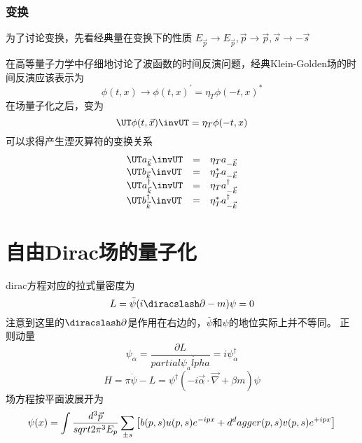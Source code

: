 \subsubsection{\T 变换}
为了讨论\T 变换，先看经典量在\T 变换下的性质
$E_{\vec p}\rightarrow E_{\vec p}, \vec p\rightarrow \vec p, \vec s\rightarrow-\vec s $

在高等量子力学中仔细地讨论了波函数的时间反演问题，经典Klein-Golden场的时间反演应该表示为
\begin{equation}
    \phi(t, x) \rightarrow \phi(t, x)^{\prime} = \eta_T\phi(-t, x)^*
\end{equation}
在场量子化之后，变为
\begin{equation}
    \UT\phi(t,\vec x)\invUT = \eta_T\phi(-t, x)
\end{equation}
可以求得产生湮灭算符的变换关系
\begin{equation}
    \begin{array}{lll}
        \UT a_{\vec k}\invUT &=& \eta_T a_{-\vec k} \\
        \UT b_{\vec k}\invUT &=& \eta_T^* a_{-\vec k} \\
        \UT a_{\vec k}^\dagger\invUT &=& \eta_T a_{-\vec k}^\dagger \\
        \UT b_{\vec k}^\dagger\invUT &=& \eta_T^* a_{-\vec k}^\dagger \\
    \end{array}
\end{equation}


\section{自由Dirac场的量子化}
dirac方程对应的拉式量密度为
\begin{equation}
    L = \bar \psi(i\diracslash \partial - m)\psi = 0
\end{equation}
注意到这里的$\diracslash \partial$是作用在右边的，$\bar \psi$和$\psi$的地位实际上并不等同。
正则动量
\begin{equation}
    \psi_\alpha = \frac {\partial L} {partial \dot{\psi_alpha}} = i\psi_\alpha^\dagger
\end{equation}
\begin{equation}
    H = \pi \dot{\psi} - L = \psi^\dagger(-i\vec \alpha \cdot \vec \nabla + \beta m)\psi
\end{equation}
场方程按平面波展开为
\begin{equation}
    \psi(x) = \int \frac{d^3\vec{p}}{sqrt{2\pi^3}E_{p}} \sum_{\pm s} \left[b(p, s)u(p, s)e^{-ipx} + d^dagger(p,s)v(p,s)e^{+ipx}\right]
\end{equation}

